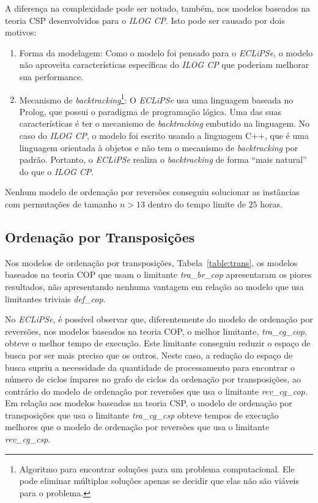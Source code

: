 A diferença na complexidade pode ser notado, também, nos modelos
baseados na teoria CSP desenvolvidos para o \textit{ILOG CP}. Isto pode
ser causado por dois motivos:
\begin{enumerate}

    \item{Forma da modelagem: Como o modelo foi pensado para o
        \textit{ECLiPSe}, o modelo não aproveita características
        específicas do \textit{ILOG CP} que poderiam melhorar sua
        performance.}

    \item{Mecanismo de \textit{backtracking}\footnote{Algoritmo para
        encontrar soluções para um problema computacional. Ele pode
        eliminar múltiplas soluções apenas se decidir que elas não são
        viáveis para o problema.}: O \textit{ECLiPSe} usa uma linguagem 
        baseada no Prolog, que possui o paradigma de programação 
        lógica. Uma das suas características é ter o mecanismo de 
        \textit{backtracking} embutido na linguagem. No caso do 
        \textit{ILOG CP}, o modelo foi escrito usando a linguagem C++, 
        que é uma linguagem orientada à objetos e não tem o mecanismo 
        de \textit{backtracking} por padrão. Portanto, o 
        \textit{ECLiPSe} realiza o \textit{backtracking} de forma 
        ``mais natural'' do que o \textit{ILOG CP}.}

\end{enumerate}

Nenhum modelo de ordenação por reversões conseguiu solucionar as
instâncias com permutações de tamanho $n > 13$ dentro do tempo limite de
$25$ horas.



\subsection{Ordenação por Transposições}
\label{subsec:analise_tra}
Nos modelos de ordenação por transposições, Tabela~\ref{table:trans}, os
modelos baseados na teoria COP que usam o limitante
\textit{tra\_br\_cop} apresentaram os piores resultados, não apresentando
nenhuma vantagem em relação ao modelo que usa limitantes triviais
\textit{def\_cop}.

No \textit{ECLiPSe}, é possível observar que, diferentemente do modelo
de ordenação por reversões, nos modelos baseados na teoria COP, o melhor
limitante, \textit{tra\_cg\_cop}, obteve o melhor tempo de execução.
Este limitante conseguiu reduzir o espaço de busca por ser mais preciso
que os outros. Neste caso, a redução do espaço de busca supriu a
necessidade da quantidade de processamento para encontrar o número de
ciclos ímpares no grafo de ciclos da ordenação por transposições, ao
contrário do modelo de ordenação por reversões que usa o limitante
\textit{rev\_cg\_cop}. Em relação aos modelos baseados na teoria CSP, o
modelo de ordenação por transposições que usa o limitante
\textit{tra\_cg\_csp} obteve tempos de execução melhores que o modelo de
ordenação por reversões que usa o limitante \textit{rev\_cg\_csp}.

